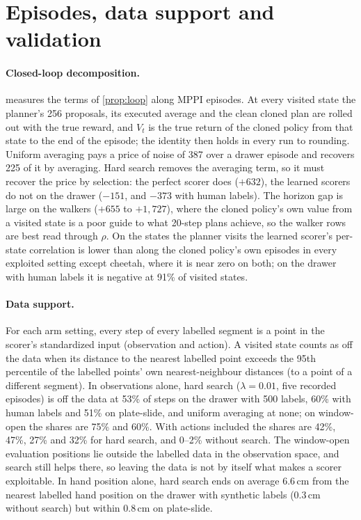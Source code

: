 \documentclass{article}
\theoremstyle{plain}
\theoremstyle{remark}
\begin{document}
\section{Episodes, data support and validation}
\label{app:loop}



\paragraph{Closed-loop decomposition.}  measures the terms of \cref{prop:loop} along MPPI episodes. At
every visited state the planner's 256 proposals, its executed average and the clean cloned plan are rolled out with the
true reward, and $V_t$ is the true return of the cloned policy from that state to the end of the episode; the identity
then holds in every run to rounding. Uniform averaging pays a price of noise of 387 over a drawer episode and recovers
225 of it by averaging. Hard search removes the averaging term, so it must recover the price by selection: the perfect
scorer does ($+632$), the learned scorers do not on the drawer ($-151$, and $-373$ with human labels). The horizon gap is
large on the walkers ($+655$ to $+1{,}727$), where the cloned policy's own value from a visited state is a poor guide to
what 20-step plans achieve, so the walker rows are best read through $\rho$. On the states the planner visits the
learned scorer's per-state correlation is lower than along the cloned policy's own episodes in every exploited setting
except cheetah, where it is near zero on both; on the drawer with human labels it is negative at 91\% of visited
states.

\paragraph{Data support.} For each arm setting, every step of every labelled segment is a point in the scorer's
standardized input (observation and action). A visited state counts as off the data when its distance to the nearest
labelled point exceeds the 95th percentile of the labelled points' own nearest-neighbour distances (to a point of a
different segment). In observations alone, hard search ($\lambda=0.01$, five recorded episodes) is off the data at 53\%
of steps on the drawer with 500 labels, 60\% with human labels and 51\% on plate-slide, and uniform averaging at none;
on window-open the shares are 75\% and 60\%. With actions included the shares are 42\%, 47\%, 27\% and 32\% for hard
search, and 0--2\% without search. The window-open evaluation positions lie outside the labelled data in the
observation space, and search still helps there, so leaving the data is not by itself what makes a scorer exploitable.
In hand position alone, hard search ends on average 6.6\,cm from the nearest labelled hand position on the drawer with
synthetic labels (0.3\,cm without search) but within 0.8\,cm on plate-slide.
\end{document}
